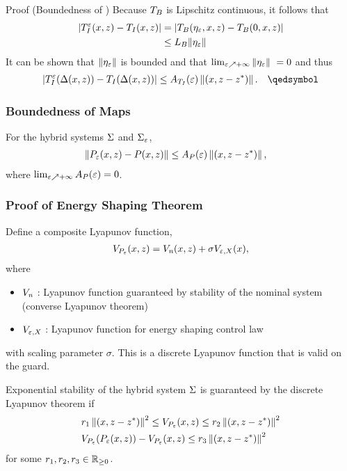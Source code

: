 \begin{frame}[t]
     {
      \begin{block}{Proof (Boundedness of \TtI{})}
        Because $T_{B}$ is Lipschitz continuous, it follows that
        \begin{align*}
          | T_{I}^{\varepsilon}(x, z) - T_{I}(x, z) | &= | T_{B}(\eta_{\varepsilon}, x, z) - T_{B}(0, x, z)|\\
          &\leq L_{B} \| \eta_{\varepsilon} \|
        \end{align*}
        It can be shown that $\| \eta_{\varepsilon} \|$ is bounded and that $\lim_{\varepsilon \nearrow +\infty} \|
        \eta_{\varepsilon} \| \ = 0$ and thus
        \begin{align*}
          | \TIe(\Deltaxz) - \TI(\Deltaxz) | \leq \ATIe \nzdxzst. &&\qedsymbol
        \end{align*}
      \end{block}
    }
\end{frame}

\begin{frame}[t]
    \frametitle{Boundedness of \Poincare{} Maps}
   {
    \begin{lemma}
      For the hybrid systems $\Sigma$ and $\Sigma_{\varepsilon}$,
      \begin{eqnarray}
        \nonumber
        &\| P_{\varepsilon}(x, z) - P(x, z) \| \leq A_{P}(\varepsilon) \left\|(x, z - z^{*})\right\|,
      \end{eqnarray}
      where  $\lim_{\varepsilon \nearrow +\infty}A_{P}(\varepsilon) = 0$.
    \end{lemma}
  }
\end{frame}

\begin{frame}[t]
  \frametitle{Proof of Energy Shaping Theorem}
   {
    Define a composite Lyapunov function,
    \begin{align*}
      V_{P_{\varepsilon}}(x, z) = V_{\mathit{n}}(x, z) + \sigma V_{\varepsilon, X}(x),
    \end{align*}
    where
    \begin{itemize}
    \item $V_{\mathit{n}}$ : Lyapunov function guaranteed by stability of the nominal system
      (converse Lyapunov theorem)
    \item $V_{\varepsilon, X}$ : Lyapunov function for energy shaping control law
    \end{itemize}
    with scaling parameter $\sigma$. This is a discrete Lyapunov function that
    is valid on the guard.
  }
  
   {
    Exponential stability of the hybrid system $\Sigma$ is guaranteed by the
    discrete Lyapunov theorem if
    \begin{eqnarray*}
      &r_{1} \left\|(x, z - z^{*})\right\|^{2} \leq V_{P_{\varepsilon}}(x, z) \leq r_{2} \left\|(x, z - z^{*})\right\|^{2}\\
      &V_{P_{\varepsilon}}(P_{\varepsilon}(x, z)) - V_{P_{\varepsilon}}(x, z) \leq r_{3} \left\|(x, z - z^{*})\right\|^{2}
    \end{eqnarray*}
    for some $r_{1}, r_{2}, r_{3} \in \mathbb{R}_{\geq 0}$.
  }
\end{frame}
